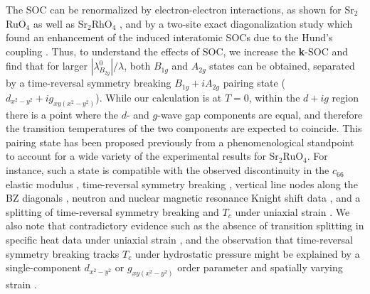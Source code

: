 \documentclass[%
reprint,
superscriptaddress,
 amsmath,amssymb,
 aps,
prb,
nobalancelastpage,
]{revtex4-2}
\begin{document}
The SOC can be renormalized by electron-electron interactions, as shown for Sr$_{2}$RuO$_{4}$ \cite{zhang2016PRL,Kim2018PRL,Tamai2019PRX} as well as Sr$_{2}$RhO$_{4}$ \cite{LiuPRL2008}, and by a two-site exact diagonalization study which found an enhancement of the induced interatomic SOCs due to the Hund's coupling \cite{IsobePRB2014}. Thus, to understand the effects of SOC, we increase the \textbf{k}-SOC and find that for larger $|\lambda_{B_{2g}}^{0}|/\lambda$, both $B_{1g}$ and $A_{2g}$ states can be obtained, separated by a time-reversal symmetry breaking $B_{1g}+iA_{2g}$ pairing state ($d_{x^2-y^2}+ig_{xy(x^2-y^2)}$). While our calculation is at $T=0$, within the $d+ig$ region there is a point where the $d$- and $g$-wave gap components are equal, and therefore the transition temperatures of the two components are expected to coincide. This pairing state has been proposed previously from a phenomenological standpoint \cite{Kivelson2020npj, yuan2021} to account for a wide variety of the experimental results for Sr$_{2}$RuO$_{4}$. For instance, such a state is compatible with the observed discontinuity in the $c_{66}$ elastic modulus \cite{Ghosh2020,Benhabib2020},  time-reversal symmetry breaking \cite{Luke1998Nature,Xia2006prl, Kidwingira2006science}, vertical line nodes along the BZ diagonals \cite{DeguchiJPS2004,Hassinger2017PRX,sharma2020PNAS}, neutron and nuclear magnetic resonance Knight shift data \cite{Pustogow2019Nature,Ishida2019, Chronister2020, Steffens2019PRL}, and a splitting of time-reversal symmetry breaking and $T_{c}$ under uniaxial strain \cite{Grinenko2020}. We also note that contradictory evidence such as the absence of transition splitting in specific heat data under uniaxial strain \cite{Li_pnas2021}, and the observation that time-reversal symmetry breaking tracks $T_{c}$ under hydrostatic pressure \cite{grinenko2021unsplit} might be explained by a single-component $d_{x^2-y^2}$ or $g_{xy(x^2-y^2)}$ order parameter and spatially varying strain \cite{willaPRB2020,yuan2021}.


\end{document}
